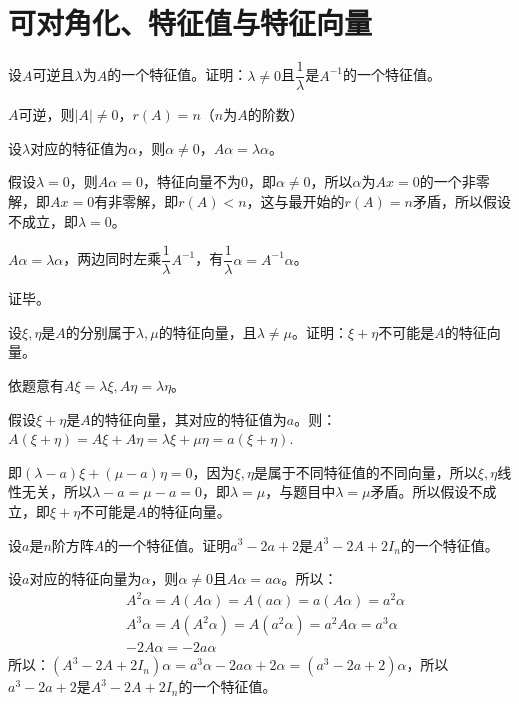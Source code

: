 \documentclass[a4paper]{report}
\begin{document}
\clearpage
\section{可对角化、特征值与特征向量}
\EX 设$A$可逆且$\lambda$为$A$的一个特征值。证明：$\lambda\neq0$且$\dfrac{1}{\lambda}$是$A^{-1}$的一个特征值。

\begin{zhengming}
$A$可逆，则$|A|\neq 0$，$r(A)=n$（$n$为$A$的阶数）

设$\lambda$对应的特征值为$\alpha$，则$\alpha\neq 0$，$A\alpha =\lambda \alpha$。

假设$\lambda =0$，则$A\alpha=0$，特征向量不为0，即$\alpha\neq0$，所以$\alpha$为$Ax=0$的一个非零解，即$Ax=0$有非零解，即$r(A)< n$，这与最开始的$r(A)=n$矛盾，所以假设不成立，即$\lambda =0$。

$A\alpha=\lambda\alpha$，两边同时左乘$\dfrac{1}{\lambda}A^{-1}$，有$\dfrac{1}{\lambda}\alpha=A^{-1}\alpha$。

证毕。
\end{zhengming}

\EX 设$\xi,\eta$是$A$的分别属于$\lambda,\mu$的特征向量，且$\lambda\neq \mu$。证明：$\xi+\eta$不可能是$A$的特征向量。

\begin{zhengming}
依题意有$A\xi=\lambda\xi,A\eta=\lambda\eta$。

假设$\xi+\eta$是$A$的特征向量，其对应的特征值为$a$。则：$A(\xi+\eta)=A\xi+A\eta=\lambda\xi+\mu\eta=a(\xi+\eta)$.

即$(\lambda-a)\xi+(\mu-a)\eta=0$，因为$\xi,\eta$是属于不同特征值的不同向量，所以$\xi,\eta$线性无关，所以$\lambda-a=\mu-a=0$，即$\lambda=\mu$，与题目中$\lambda=\mu$矛盾。所以假设不成立，即$\xi+\eta$不可能是$A$的特征向量。
\end{zhengming}

\EX 设$a$是$n$阶方阵$A$的一个特征值。证明$a^3-2a+2$是$A^3-2A+2I_n$的一个特征值。

\begin{zhengming}
设$a$对应的特征向量为$\alpha$，则$\alpha\neq 0$且$A\alpha=a\alpha$。所以：
\begin{align*}
&A^2\alpha=A(A\alpha)=A(a\alpha)=a(A\alpha)=a^2\alpha\\
&A^3\alpha=A(A^2\alpha)=A(a^2\alpha)=a^2A\alpha=a^3\alpha\\
&-2A\alpha=-2a\alpha
\end{align*}
所以：$(A^3-2A+2I_n)\alpha=a^3\alpha-2a\alpha+2\alpha=(a^3-2a+2)\alpha$，所以$a^3-2a+2$是$A^3-2A+2I_n$的一个特征值。
\end{zhengming}
\end{document}
